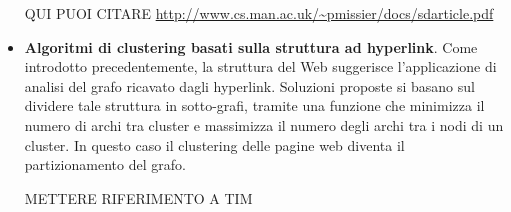 \begin{itemize}
QUI PUOI CITARE \url{http://www.cs.man.ac.uk/~pmissier/docs/sdarticle.pdf}

\item \textbf{Algoritmi di clustering basati sulla struttura ad hyperlink}. Come introdotto precedentemente, la struttura del Web suggerisce l'applicazione di analisi del grafo ricavato dagli hyperlink. Soluzioni proposte \cite{Luxburg07} si basano sul dividere tale struttura in sotto-grafi, tramite una funzione che minimizza il numero di archi tra cluster e massimizza il numero degli archi tra i nodi di un cluster. In questo caso il clustering delle pagine web diventa il partizionamento del grafo.  

METTERE RIFERIMENTO A TIM 
\end{itemize}






